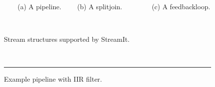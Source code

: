 \begin{figure*}[t]
\begin{singlespace}

~~~~~
\begin{minipage}{0.46in}
{\centering
{} \\
}
\end{minipage} 
~
\begin{minipage}{1.3in}
{\centering
{} \\
}
\end{minipage}
~
\begin{minipage}{1.02in}
{\centering
{} \\
}
\end{minipage}
~~~~~~~~~~~~
\begin{minipage}{3in}
\vspace{36pt}
~~~~
\end{minipage}
\\ ~ \\ {\mbox{~~~}\protect\small \mbox{~}(a) A pipeline. ~~~~(b) A splitjoin. ~~~~~~~~(c) A feedbackloop.}

~\begin{minipage}{3.5in}
\caption{Stream structures supported by StreamIt.
\protect\label{fig:structures}}
\end{minipage}
~~~~~~
\begin{minipage}{3in}
\caption{Example pipeline with IIR filter.\protect\label{fig:iir-pipeline}}
\end{minipage}
\vspace{6pt}
\hrule
\vspace{6pt}


\end{singlespace}
\end{figure*}
